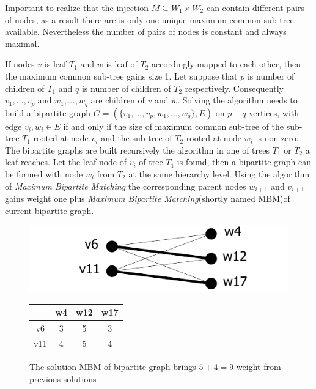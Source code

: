 \documentclass{report}
\begin{document}
Important to realize that the injection $M \subseteq W_{1} \times  W_{2}$ can contain different pairs of nodes, as a result there are is only one unique maximum common sub-tree available. Nevertheless the number of pairs of nodes is constant and always maximal.

If nodes $v$ is leaf $ T_{1}$ and $w$ is leaf of $T_{2 }$ accordingly mapped to each other, then the maximum common sub-tree gains size 1. Let suppose that $p$ is number of children of $ T_{1}$ and $q$ is number of children of $ T_{2}$ respectively. Consequently $ v_{1},...,v_{p}$ and $ w_{1},...,w_{q}$ are children of 
 $v$  and $w$\cite{valiente}. Solving the algorithm needs to build a bipartite graph $G=(\{v_{1},...,v_{p}, w_{1},...,w_{q} \}, E)$ on $p+q$ vertices, with edge 
$ v_{i},w_{i} \in E$  if and only if the size of maximum common sub-tree of the sub-tree $ T_{1}$ rooted at node $ v_{i}$ and the sub-tree of $T_{2 }$ rooted at node $ w_{i}$ is non zero\cite{valiente}. 
The bipartite graphs are built recursively the algorithm in one of trees $ T_{1}$ or $ T_{2}$ a leaf reaches. Let the leaf node of $ v_{i}$ of tree $ T_{1}$ is found, then a bipartite graph can be formed with node $ w_{i}$ from $ T_{2}$ at the same hierarchy level. Using the algorithm of \emph{Maximum Bipartite Matching} the corresponding parent nodes $ w_{i+1}$ and $ v_{i+1}$ gains weight one plus \emph{Maximum Bipartite Matching}(shortly named MBM)of current bipartite graph.

\begin{figure}
  \begin{minipage}[h]{0.60\linewidth}
    \centering
    \includegraphics[scale=0.95]{Figures/algorithms/TD/1ex.pdf}\\[0.1cm]
    
  \end{minipage}%
  \begin{minipage}[b]{0.30\linewidth}
    \centering
\begin{tabular}{|c|c|c|c|}
\hline
    & w4 & w12                       & w17                       \\ \hline
v6  & 3  & \cellcolor[gray]{0.9} 5 & 3                         \\ \hline
v11 & 4  & 5                         & \cellcolor[gray]{0.9}4 \\ \hline
\end{tabular}
\end{minipage}
\caption{The solution MBM of bipartite graph brings $5+4=9$ weight from previous solutions}
\label{fig:ex1}
\end{figure}
\end{document}

